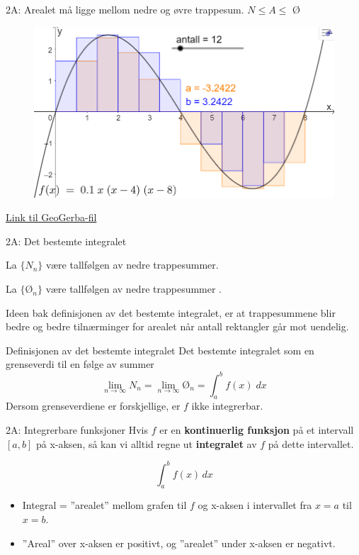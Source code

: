 \blueheader
\begin{frame}{2A: Arealet må ligge mellom nedre og øvre trappesum. $N\leq A\leq$ Ø}
\begin{figure}
    \centering
    \includegraphics[width=0.7\linewidth]{R2-K2A-8.png}

\end{figure}

\href{https://www.geogebra.org/classic/rp6mbmm6}{Link til GeoGerba-fil}
\end{frame}

\blueheader
\begin{frame}{2A: Det bestemte integralet}

La  $\{N_n\}$ være tallfølgen av nedre trappesummer.

\medskip
La  $\{\text{Ø}_n\}$ være tallfølgen av nedre trappesummer  .

\medskip
Ideen bak definisjonen av det bestemte integralet, er at trappesummene blir bedre og bedre tilnærminger for arealet når antall rektangler går mot uendelig.

\begin{blue*}{Definisjonen av det bestemte integralet}
Det bestemte integralet som en grenseverdi til en følge av summer
\begin{equation*}
    \lim_{n\rightarrow \infty }N_ n =\lim_{n\rightarrow \infty }\text{Ø}_n=\int_a^bf(x)\;dx
\end{equation*}
Dersom grenseverdiene er forskjellige, er $f$ ikke integrerbar.
\end{blue*}
\end{frame}

\redheader
\begin{frame}{2A: Integrerbare funksjoner}
Hvis $f$ er en \textbf{kontinuerlig funksjon} på et intervall $[a,b]$ på x-aksen,  
så kan vi alltid regne ut \textbf{integralet} av $f$ på dette intervallet.  

\medskip

\[
    \int_a^b f(x)\,dx
\]

\medskip
\begin{itemize}
    \item Integral = ''arealet'' mellom grafen til $f$  
          og x-aksen i intervallet fra $x=a$ til $x=b$.
    \item ''Areal'' over x-aksen er positivt, og ''arealet'' under x-aksen er negativt.
\end{itemize}
\end{frame}

